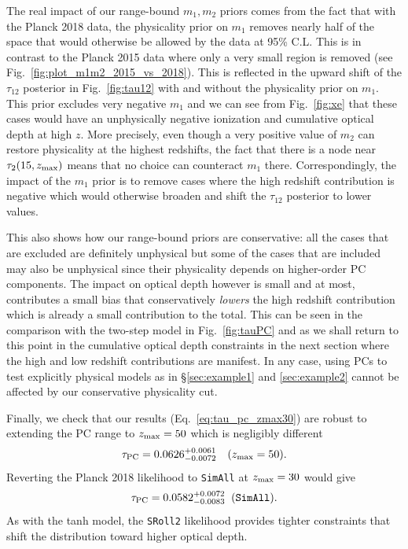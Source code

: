 \documentclass[aps,prd,twocolumn,amsmath,amssymb,showpacs,floatfix,superscriptaddress,nofootinbib]{revtex4-1}
\newcommand{\zmax}{z_{\rm max}}
\newcommand{\beq}{\begin{equation}}
\newcommand{\eeq}{\end{equation}}
\begin{document}
{The real impact of our range-bound $m_1,m_2$ priors comes from the fact that with the Planck 2018 data, the physicality prior on $m_1$
removes nearly half of the space that would otherwise be allowed by the
data at 95\% C.L.  This is in contrast to the Planck 2015 data where only a very small region is removed (see Fig.~\ref{fig:plot_m1m2_2015_vs_2018}).  
This is reflected in the upward shift of the $\tau_{12}$ posterior in Fig.~\ref{fig:tau12} with and without the physicality prior on $m_1$.   This prior excludes very negative $m_1$ and we can see from Fig.~\ref{fig:xe} that these cases would have an unphysically negative ionization and cumulative optical depth at high $z$.  More precisely, even though a very positive value 
of $m_2$ can restore physicality at the highest redshifts, the fact that there is a node near $\tau_2(15,z_{\rm max})$ means that no choice can counteract $m_1$ there.  
Correspondingly, the impact of the $m_1$ prior is to remove
cases where the high redshift contribution is negative which would otherwise broaden and shift the $\tau_{12}$ posterior to lower values.

This also shows how our range-bound priors 
are conservative: all the cases that are excluded are definitely unphysical but some of the cases that are included
may also be unphysical since their physicality depends on higher-order PC components.  The impact on optical depth  however is small and at most, contributes a small bias that conservatively {\it lowers} the high redshift contribution which is already a small contribution to the total.  
This can be seen  in the comparison with the two-step model 
in Fig.~\ref{fig:tauPC} and as we shall return to this point in the cumulative optical depth constraints in the next section where the high and low redshift contributions are manifest.
In any case, using PCs to 
test explicitly physical models as in \S \ref{sec:example1} and
\ref{sec:example2} cannot be affected by our conservative physicality
cut.

Finally, we check that our results (Eq.~\ref{eq:tau_pc_zmax30}) are robust to
 extending the PC
range to
$z_{\rm max}=50$ which is negligibly different
%
\beq
\tau_{\rm PC} = 0.0626^{+0.0061}_{-0.0072}\quad (\zmax=50).
\eeq
%
Reverting the Planck 2018 likelihood to \texttt{SimAll} at $z_{\rm max}=30$ would give
\beq
\tau_{\rm PC} = 0.0582 ^{+0.0072}_{-0.0083}\;\; (\texttt{SimAll}).
\eeq
As with the tanh model, the \texttt{SRoll2} likelihood provides tighter constraints that shift the distribution toward higher optical depth.



}
\end{document}

